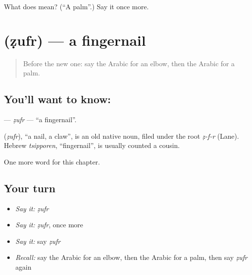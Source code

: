 \begin{tcolorbox}[breakable,colback=teal!4,colframe=teal!35!black,title={Before you move on}]
What does  mean? (\textquotedblleft{}A palm\textquotedblright{}.) Say it once more.
\end{tcolorbox}
\section[\texorpdfstring{\ar{ظفر} (ẓufr)}{ظفر (ẓufr)}]{ (ẓufr) — a fingernail}

\label{lesson:AR-C140-zufr}



\begin{quote}
Before the new one: say the Arabic for an elbow, then the Arabic for a palm.
\end{quote}

\subsection*{You'll want to know: }
\textbf{} — \emph{ẓufr} — \textquotedblleft{}a fingernail\textquotedblright{}.

\begin{cousinweb}
\textbf{} (\emph{ẓufr}), \textquotedblleft{}a nail, a claw\textquotedblright{}, is an old native noun, filed under the root \emph{ẓ-f-r} (Lane). Hebrew \emph{tsipporen}, \textquotedblleft{}fingernail\textquotedblright{}, is usually counted a cousin.
\end{cousinweb}

\begin{grammarlens}[title={What you've built}]
One more word for this chapter.
\end{grammarlens}

\subsection*{Your turn}
\begin{itemize}
\raggedright
  \item \emph{Say it:} \emph{ẓufr}
  \item \emph{Say it:} \emph{ẓufr}, once more
  \item \emph{Say it:} say \emph{ẓufr}
  \item \emph{Recall:} say the Arabic for an elbow, then the Arabic for a palm, then say \emph{ẓufr} again
\end{itemize}

